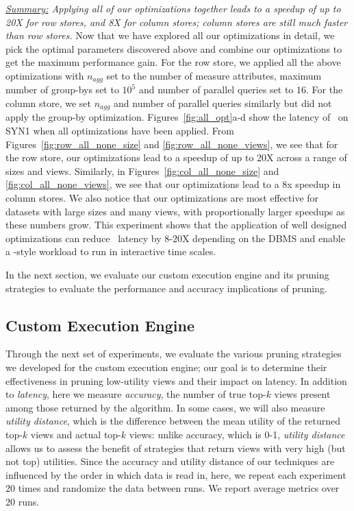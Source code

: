 {\em \underline{Summary:} Applying all of our optimizations together
leads to a speedup of up to 20X for row stores, and 8X for column stores;
column stores are still much faster than row stores.}
Now that we have explored all our optimizations in detail, we pick the optimal
parameters discovered above and combine our optimizations to get the maximum
performance gain. 
For the row store, we applied all the above optimizations with $n_{agg}$ set to
the number of measure attributes, maximum number of group-bys set to $10^5$ and
number of parallel queries set to $16$.
For the column store, we set $n_{agg}$ and number of parallel queries similarly
but did not apply the group-by optimization. 
Figures~\ref{fig:all_opt}a-d show the latency of \VizRecDB\ on SYN1 when all
optimizations have been applied.
From Figures~\ref{fig:row_all_none_size} and \ref{fig:row_all_none_views}, we
see that for the row store, our optimizations lead to a speedup of up to 20X
across a range of sizes and views.
Similarly, in Figures~\ref{fig:col_all_none_size}
and \ref{fig:col_all_none_views}, we see that our optimizations lead to a 8x
speedup in column stores. 
We also notice that our optimizations are most effective for datasets with large
sizes and many views, with proportionally larger speedups as these numbers grow.
This experiment shows that the application of well designed optimizations
can reduce \VizRecDB\ latency by 8-20X depending on the DBMS and enable a
\VizRecDB-style workload to run in interactive time scales.

In the next section, we evaluate our custom execution engine and
its pruning strategies to evaluate the performance and accuracy implications of
pruning.

\subsection{Custom Execution Engine}
\label{sec:custom_execution_engine}

Through the next set of experiments, we evaluate the various pruning strategies
we developed for the custom execution engine; our goal is to determine
their effectiveness in pruning low-utility views and their impact on latency.
In addition to {\em latency}, here we measure {\em accuracy},
the number of true top-$k$ views present among those returned by the algorithm.
In some cases, we will also measure {\em utility distance},
which is the difference between the mean utility of the returned top-$k$ views
and actual top-$k$ views: unlike accuracy, which is 0-1, {\em utility distance}
allows us to assess the benefit of strategies that return views with very high 
(but not top) utilities.
Since the accuracy and utility distance of our techniques are influenced by the
order in which data is read in, here, we repeat each experiment 20
times and randomize the data between runs. We report average
metrics over 20 runs.

